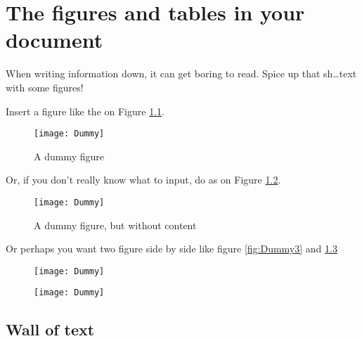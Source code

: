 
\chapter{The figures and tables in your document}

When writing information down, it can get boring to read.
Spice up that sh\dots text with some figures!

Insert a figure like the on Figure \ref{fig:Dummy1}.

\begin{figure}[hbtp]
\centering
\texttt{[image: Dummy]}
\caption{A dummy figure}
\label{fig:Dummy1}
\end{figure}

Or, if you don't really know what to input, do as on Figure \ref{fig:Dummy2}.

\begin{figure}[hbtp]
\centering
\texttt{[image: Dummy]}
\caption{A dummy figure, but without content}
\label{fig:Dummy2}
\end{figure}

Or perhaps you want two figure side by  side like figure \ref{fig:Dummy3} and \ref{fig:Dummy4}

\begin{figure}[hbtp]
	\centering

	\begin{minipage}[t]{.45\textwidth}
		\texttt{[image: Dummy]}
		\label{fig:Dummy3}
	\end{minipage} 
	\hfill %
	\begin{minipage}[t]{.45\textwidth}
		\texttt{[image: Dummy]}
		\label{fig:Dummy4}
	\end{minipage}

\end{figure}



\section{Wall of text}

\lipsum[1-5]





\newpage

